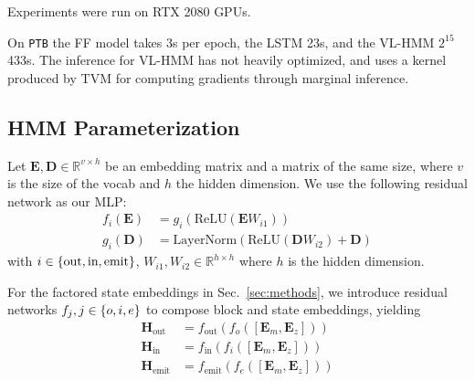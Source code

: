 \documentclass[11pt,a4paper]{article}
\begin{document}
Experiments were run on RTX 2080 GPUs.

On \texttt{PTB} the FF model takes 3s per epoch, the LSTM 23s,
and the VL-HMM $2^{15}$ 433s.
The inference for VL-HMM has not heavily optimized,
and uses a kernel produced by TVM \citep{tvm} for computing
gradients through marginal inference.

\subsection{HMM Parameterization}
Let $\mathbf{E},\mathbf{D}\in\mathbb{R}^{v \times h}$ be an
embedding matrix and a matrix of the same size,
where $v$ is the size of the vocab and $h$ the hidden dimension.
We use the following residual network as our MLP:
\begin{equation}
\label{eqn:res}
\begin{aligned}
f_i(\mathbf{E}) &= g_i(\textrm{ReLU}(\mathbf{E}W_{i1}))\\
g_i(\mathbf{D}) &= \textrm{LayerNorm}(\textrm{ReLU}(\mathbf{D}W_{i2}) + \mathbf{D})
\end{aligned}
\end{equation}
with $i \in \left\{\textrm{out},\textrm{in},\textrm{emit}\right\}$,
$W_{i1},W_{i2} \in \mathbb{R}^{h \times h}$
where $h$ is the hidden dimension.

For the factored state embeddings in Sec.~\ref{sec:methods}, we
introduce residual networks $f_j,j\in\left\{o,i,e\right\}$
to compose block and state embeddings, yielding
\begin{equation}
\begin{aligned}
\mathbf{H}_\textrm{out} &= f_\textrm{out}(f_o([\mathbf{E}_m,\mathbf{E}_z]))\\
\mathbf{H}_\textrm{in} &= f_\textrm{in}(f_i([\mathbf{E}_m,\mathbf{E}_z]))\\
\mathbf{H}_\textrm{emit} &= f_\textrm{emit}(f_e([\mathbf{E}_m,\mathbf{E}_z]))
\end{aligned}
\end{equation}
\end{document}
